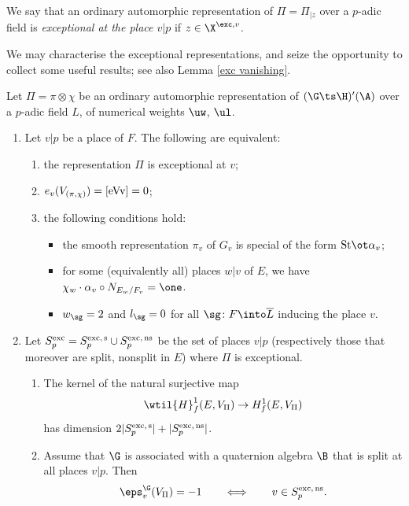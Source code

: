 We say that an ordinary  automorphic representation of $\Pi=\Pi_{|z}$ over a $p$-adic field  is \emph{exceptional at the place $v\vert p$} if $z\in \X^{\exc, v}$.



We may characterise the exceptional representations, and seize the opportunity to collect some useful results; see also Lemma \ref{exc vanishing}.





\begin{lemm} Let $\Pi=\pi\otimes\chi$ be an ordinary automorphic representation of $(\G\ts\H)'(\A)$ over a $p$-adic field $L$,  of numerical weights $\uw$, $\ul$.
\begin{enumerate}
\item  Let $v\vert p$ be a place of $F$. The  following are equivalent:
\begin{enumerate}
\item
the representation $\Pi$ is exceptional  at $v$;
\item $e_{v}(V_{(\pi, \chi)})= \eqref{eVv}=0$;
\item the following conditions hold:
\begin{itemize}
 \item  the smooth representation $\pi_{v}$ of $G_{v}$ is special of the form ${\rm St}\ot\alpha_{v}$;
 \item for some (equivalently all)  places $w\vert v $ of $E$, we have $\chi_{w} \cdot \alpha_{v}\circ N_{E_{w}/F_{v}}=\one$.
 \item $w_{\sg}=2$ and $l_{\sg}=0$ for all $\sg\colon F\into \overline{L}$ inducing the place $v$.
\end{itemize}\end{enumerate}
\item Let $S_{p}^{\rm exc}= S_{p}^{\rm exc,\, s} \cup S_{p}^{\rm exc, \, ns}$ be the set of places $v\vert p$ (respectively those that  moreover are split, nonsplit in $E$) where $\Pi$ is exceptional.
\begin{enumerate}
\item The kernel of the natural surjective map $$\wtil{H}^{1}_{f}(E, V_{\Pi}) \to{H}^{1}_{f}(E, V_{\Pi})$$
has dimension
$2 |S_{p}^{\rm exc, \, s}| + |S_{p}^{\rm exc, \, ns}|$.
\item  Assume that $\G$ is associated with a quaternion algebra  $\B$ that is split at all places $v\vert p$.  Then
$$\eps_{v}^{\G}(V_{\Pi}) = -1\qquad  \Longleftrightarrow  \qquad v\in S_{p}^{\rm exc, \, ns}.$$
\end{enumerate}
\end{enumerate}
\end{lemm}
